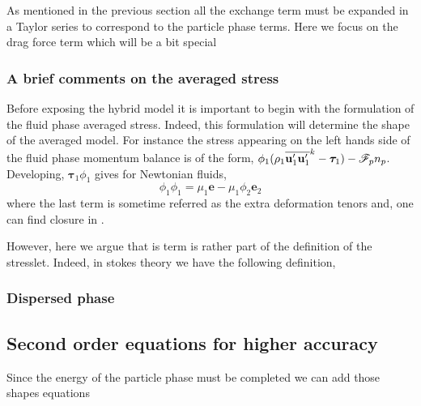 As mentioned in the previous section all the exchange term must be expanded in a Taylor series to correspond to the particle phase terms. 
Here we focus on the drag force term which will be a bit special


\subsubsection{A brief comments on the averaged stress}

Before exposing the hybrid model it is important to begin with the formulation of the fluid phase averaged stress.
Indeed, this formulation will determine the shape of the averaged model.
For instance the stress appearing on the left hands side of the fluid phase momentum balance is of the form, 
$\phi_1 (\rho_1\overline{\textbf{u}_1'\textbf{u}_1'}^k - \bm{\tau}_1) - \mathscr{F}_p n_p$. 
Developing,  $\bm{\tau}_1\phi_1$  gives for Newtonian fluids,
\begin{equation*}
    \phi_1 \phi_1
    = \mu_1 \textbf{e} - \mu_1 \phi_2 \textbf{e}_2
\end{equation*}
where the last term is sometime referred as the extra deformation tenors and, one can find closure in \citet{ishii2010thermo}. 

However, here we argue that is term is rather part of the definition of the stresslet.
Indeed, in stokes theory we have the following definition,  




\subsubsection{Dispersed phase}


\subsection{Second order equations for higher accuracy}
Since the energy of the particle phase must be completed we can add those shapes equations



